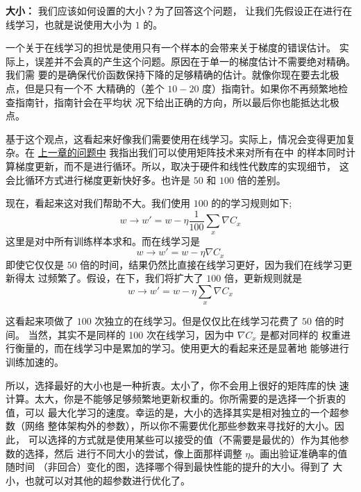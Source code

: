 \label{mini_batch_size}
\textbf{\minibatch{}大小：} 我们应该如何设置\minibatch{}的大小？为了回答这个问题，
让我们先假设正在进行在线学习，也就是说使用大小为 $1$ 的\minibatch{}。

一个关于在线学习的担忧是使用只有一个样本的\minibatch{}会带来关于梯度的错误估计。
实际上，误差并不会真的产生这个问题。原因在于单一的梯度估计不需要绝对精确。我们需
要的是确保代价函数保持下降的足够精确的估计。就像你现在要去北极点，但是只有一个不
大精确的（差个 $10-20$ 度）指南针。如果你不再频繁地检查指南针，指南针会在平均状
况下给出正确的方向，所以最后你也能抵达北极点。

基于这个观点，这看起来好像我们需要使用在线学习。实际上，情况会变得更加复杂。在
\hyperref[ch:]{上一章的问题中} 我指出我们可以使用矩阵技术来对所有在\minibatch{}中
的样本同时计算梯度更新，而不是进行循环。所以，取决于硬件和线性代数库的实现细节，
这会比循环方式进行梯度更新快好多。也许是 $50$ 和 $100$ 倍的差别。

现在，看起来这对我们帮助不大。我们使用 $100$ 的\minibatch{}的学习规则如下;
\begin{equation}
  w \rightarrow w' = w-\eta \frac{1}{100} \sum_x \nabla C_x
  \label{eq:100}\tag{100}
\end{equation}
这里是对\minibatch{}中所有训练样本求和。而在线学习是
\begin{equation}
  w \rightarrow w' = w-\eta \nabla C_x
  \label{eq:101}\tag{101}
\end{equation}
即使它仅仅是 $50$ 倍的时间，结果仍然比直接在线学习更好，因为我们在线学习更新得太
过频繁了。假设，在\minibatch{}下，我们将\learningrate{}扩大了 $100$ 倍，更新规则就是
\begin{equation}
  w \rightarrow w' = w-\eta \sum_x \nabla C_x
  \label{eq:102}\tag{102}
\end{equation}

这看起来项做了 $100$ 次独立的在线学习。但是仅仅比在线学习花费了 $50$ 倍的时间。
当然，其实不是同样的 100 次在线学习，因为\minibatch{}中 $\nabla C_x$ 是都对同样的
权重进行衡量的，而在线学习中是累加的学习。使用更大的\minibatch{}看起来还是显著地
能够进行训练加速的。

所以，选择最好的\minibatch{}大小也是一种折衷。太小了，你不会用上很好的矩阵库的快
速计算。太大，你是不能够足够频繁地更新权重的。你所需要的是选择一个折衷的值，可以
最大化学习的速度。幸运的是，\minibatch{}大小的选择其实是相对独立的一个超参数（网络
  整体架构外的参数），所以你不需要优化那些参数来寻找好的\minibatch{}大小。因此，
可以选择的方式就是使用某些可以接受的值（不需要是最优的）作为其他参数的选择，然后
进行不同\minibatch{}大小的尝试，像上面那样调整 $\eta$。画出验证准确率的值随时间
（非回合）变化的图，选择哪个得到最快性能的提升的\minibatch{}大小。得到了
\minibatch{}大小，也就可以对其他的超参数进行优化了。

